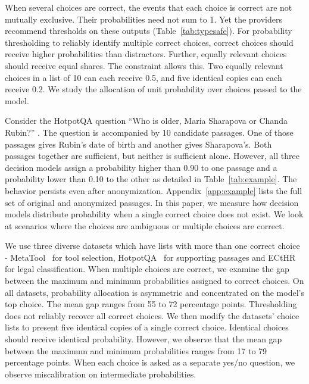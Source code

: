 
When several choices are correct, the events that each choice is correct are not mutually exclusive. Their probabilities need not sum to 1. Yet the providers recommend thresholds on these outputs (Table~\ref{tab:typesafe}). For probability thresholding to reliably identify multiple correct choices, correct choices should receive higher probabilities than distractors. Further, equally relevant choices should receive equal shares. The constraint allows this. Two equally relevant choices in a list of 10 can each receive 0.5, and five identical copies can each receive 0.2. We study the allocation of unit probability over choices passed to the model.

Consider the HotpotQA question ``Who is older, Maria Sharapova or Chanda Rubin?'' \citep{yang2018hotpotqa}. The question is accompanied by 10 candidate passages. One of those passages gives Rubin's date of birth and another gives Sharapova's. Both passages together are sufficient, but neither is sufficient alone. However, all three decision models assign a probability higher than 0.90 to one passage and a probability lower than 0.10 to the other as detailed in Table~\ref{tab:example}. The behavior persists even after anonymization. Appendix~\ref{app:example} lists the full set of original and anonymized passages. In this paper, we measure how decision models distribute probability when a single correct choice does not exist. We look at scenarios where the choices are ambiguous or multiple choices are correct.



We use three diverse  datasets which have lists with more than one correct choice - MetaTool~\citep{huang2024metatool} for tool selection, HotpotQA~\citep{yang2018hotpotqa} for supporting passages and ECtHR~\citep{chalkidis2022lexglue} for legal classification. When multiple choices are correct, we examine the gap between the maximum and minimum probabilities assigned to correct choices. On all datasets, probability allocation is asymmetric and concentrated on the model's top choice. The mean gap ranges from 55 to 72 percentage points. Thresholding does not reliably recover all correct choices. We then modify the datasets' choice lists to present five identical copies of a single correct choice. Identical choices should receive identical probability. However, we observe that the mean gap between the maximum and minimum probabilities ranges from 17 to 79 percentage points. When each choice is asked as a separate yes/no question, we observe miscalibration on intermediate probabilities.

